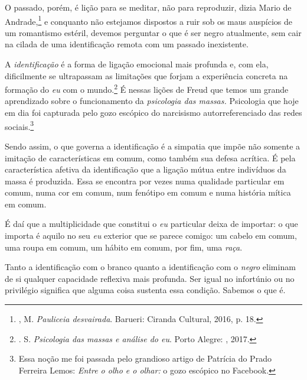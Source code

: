 O passado, porém, é lição para se meditar, não para reproduzir, dizia
Mario de Andrade,\footnote{, M. \emph{Pauliceia desvairada}.
  Barueri: Ciranda Cultural, 2016, p. 18.} e conquanto não estejamos
dispostos a ruir sob os maus auspícios de um romantismo estéril, devemos
perguntar o que é ser negro atualmente, sem cair na cilada de uma
identificação remota com um passado inexistente.

A \emph{identificação} é a forma de ligação emocional mais profunda e,
com ela, dificilmente se ultrapassam as limitações que forjam a
experiência concreta na formação do \emph{eu} com o mundo.\footnote{.
  S. \emph{Psicologia das massas e análise do eu}. Porto Alegre: ,
  2017.} É nessas lições de Freud que temos um grande aprendizado sobre
o funcionamento da \emph{psicologia das massas.}
Psicologia que hoje em dia foi
capturada pelo gozo escópico do narcisismo autorreferenciado das redes
sociais.\footnote{Essa noção me foi passada pelo grandioso artigo de
  Patrícia do Prado Ferreira Lemos: \emph{Entre o olho e o olhar:} o
  gozo escópico no Facebook.}

Sendo assim, o que governa a identificação é a simpatia que impõe não
somente a imitação de características em comum, como também sua defesa
acrítica. É pela característica afetiva da identificação que a ligação
mútua entre indivíduos da massa é produzida. Essa se encontra por vezes
numa qualidade particular em comum, numa cor em comum, num fenótipo em
comum e numa história mítica em comum.

É daí que a multiplicidade que constitui o \emph{eu} particular deixa de
importar: o que importa é aquilo no seu \emph{eu} exterior que se parece
comigo: um cabelo em comum, uma roupa em comum, um hábito em comum, por
fim, uma \emph{raça}.

Tanto a identificação com o branco quanto a identificação com o
\emph{negro} eliminam de si qualquer capacidade reflexiva mais profunda.
Ser igual no infortúnio ou no privilégio significa que alguma coisa
sustenta essa condição. Sabemos o que é.

